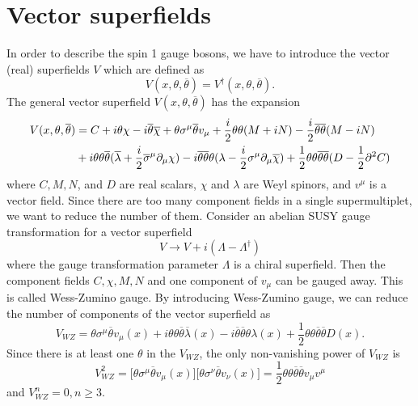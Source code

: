 \documentclass[12pt]{report}
\begin{document}
\section{Vector superfields}
In order to describe the spin 1 gauge bosons, we have to introduce the vector (real) superfields $V$ which are defined as
\begin{equation}
V(x, \theta, \overline{\theta}) = V^{\dag} (x, \theta, \overline{\theta}) .
\end{equation}
The general vector superfield $V(x, \theta, \overline{\theta})$ has the expansion
\begin{align}
V(x, \theta, \overline{\theta}) &= C + i \theta \chi - i \overline{\theta} \overline{\chi} + \theta \sigma^{\mu} \overline{\theta} v_{\mu} + \frac{i}{2} \theta \theta (M + iN) - \frac{i}{2} \overline{\theta} \overline{\theta} (M - iN) \notag \\
& + i \theta \theta \overline{\theta} (\overline{\lambda} + \frac{i}{2} \overline{\sigma}^{\mu} \partial_{\mu} \chi ) - i \overline{\theta} \overline{\theta} \theta (\lambda - \frac{i}{2} \sigma^{\mu} \partial_{\mu} \overline{\chi}) + \frac{1}{2} \theta \theta \overline{\theta} \overline{\theta} (D - \frac{1}{2} \partial^{2} C)
\end{align}
where $C, M, N$, and $D$ are real scalars, $\chi$ and $\lambda$ are Weyl spinors, and $v^{\mu}$ is a vector field.
Since there are too many component fields in a single supermultiplet, we want to reduce the number of them.
Consider an abelian SUSY gauge transformation for a vector superfield
\begin{equation}
V \to V + i (\Lambda - \Lambda^{\dag})
\end{equation}
where the gauge transformation parameter $\Lambda$ is a chiral superfield. Then the component fields $C, \chi, M, N$ and one component of $v_{\mu}$ can be gauged away.
This is called Wess-Zumino gauge.
By introducing Wess-Zumino gauge, we can reduce the number of components of the vector superfield as
\begin{equation} \label{eq: WZ gauge vector superfield}
V_{WZ} = \theta \sigma^{\mu} \overline{\theta} v_{\mu}(x) + i \theta \theta \overline{\theta} \overline{\lambda}(x) - i \overline{\theta} \overline{\theta} \theta \lambda(x) + \frac{1}{2} \theta \theta \overline{\theta} \overline{\theta} D(x) .
\end{equation}
Since there is at least one $\theta$ in the $V_{WZ}$, the only non-vanishing power of $V_{WZ}$ is
\begin{equation}
V^{2}_{WZ} = \big[ \theta \sigma^{\mu} \overline{\theta} v_{\mu}(x) \big] \big[ \theta \sigma^{\nu} \overline{\theta} v_{\nu}(x) \big] = \frac{1}{2} \theta \theta \overline{\theta} \overline{\theta} v_{\mu} v^{\mu}
\end{equation}
and $V^{n}_{WZ} = 0, n \ge 3$.
\end{document}
